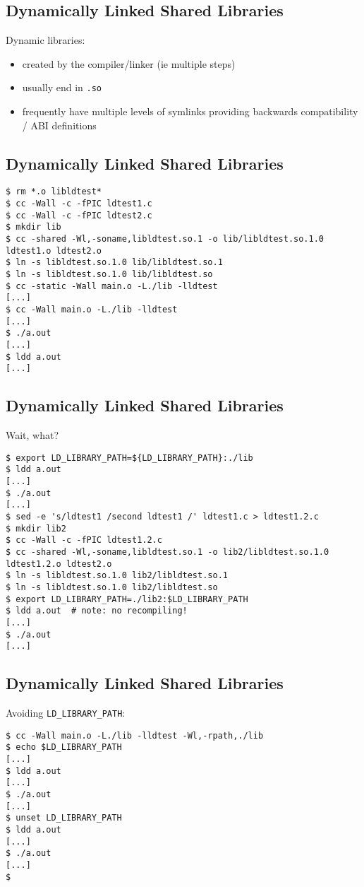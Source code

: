 \documentclass[xga]{xdvislides}
\begin{document}
\subsection{Dynamically Linked Shared Libraries}
Dynamic libraries:
\begin{itemize}
	\item created by the compiler/linker (ie multiple steps)
	\item usually end in {\tt .so}
	\item frequently have multiple levels of symlinks providing
		backwards compatibility / ABI definitions
\end{itemize}

\subsection{Dynamically Linked Shared Libraries}
\begin{verbatim}
$ rm *.o libldtest*
$ cc -Wall -c -fPIC ldtest1.c
$ cc -Wall -c -fPIC ldtest2.c
$ mkdir lib
$ cc -shared -Wl,-soname,libldtest.so.1 -o lib/libldtest.so.1.0 ldtest1.o ldtest2.o
$ ln -s libldtest.so.1.0 lib/libldtest.so.1
$ ln -s libldtest.so.1.0 lib/libldtest.so
$ cc -static -Wall main.o -L./lib -lldtest
[...]
$ cc -Wall main.o -L./lib -lldtest
[...]
$ ./a.out
[...]
$ ldd a.out
[...]
\end{verbatim}

\subsection{Dynamically Linked Shared Libraries}
Wait, what?
\begin{verbatim}
$ export LD_LIBRARY_PATH=${LD_LIBRARY_PATH}:./lib
$ ldd a.out
[...]
$ ./a.out
[...]
$ sed -e 's/ldtest1 /second ldtest1 /' ldtest1.c > ldtest1.2.c
$ mkdir lib2
$ cc -Wall -c -fPIC ldtest1.2.c
$ cc -shared -Wl,-soname,libldtest.so.1 -o lib2/libldtest.so.1.0 ldtest1.2.o ldtest2.o
$ ln -s libldtest.so.1.0 lib2/libldtest.so.1
$ ln -s libldtest.so.1.0 lib2/libldtest.so
$ export LD_LIBRARY_PATH=./lib2:$LD_LIBRARY_PATH
$ ldd a.out  # note: no recompiling!
[...]
$ ./a.out
[...]
\end{verbatim}

\subsection{Dynamically Linked Shared Libraries}
Avoiding {\tt LD\_LIBRARY\_PATH}:
\begin{verbatim}
$ cc -Wall main.o -L./lib -lldtest -Wl,-rpath,./lib
$ echo $LD_LIBRARY_PATH
[...]
$ ldd a.out
[...]
$ ./a.out
[...]
$ unset LD_LIBRARY_PATH
$ ldd a.out
[...]
$ ./a.out
[...]
$
\end{verbatim}
\end{document}
